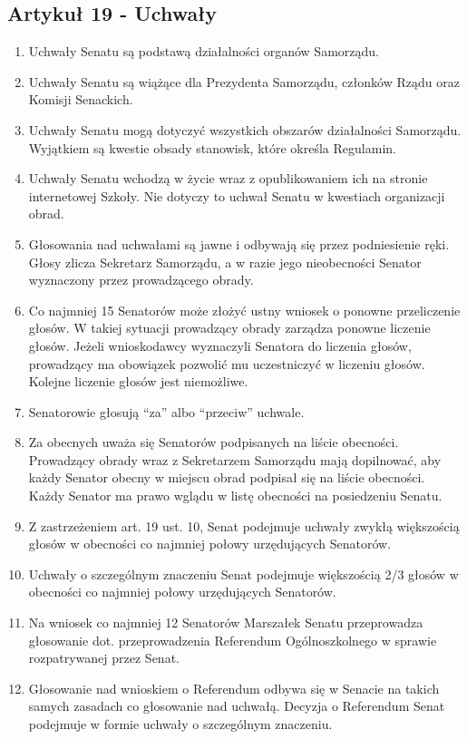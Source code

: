 \documentclass[14pt]{article}
\newenvironment{ustepy}{%
	\begin{enumerate}[leftmargin=1.5em, itemindent=1pt, labelwidth=1em, itemsep=5pt]
	}{%
	\end{enumerate}
}
\begin{document}
\subsection*{Artykuł 19 - Uchwały}
\begin{ustepy}
	\item Uchwały Senatu są podstawą działalności organów Samorządu.
	\item Uchwały Senatu są wiążące dla Prezydenta Samorządu, członków Rządu oraz Komisji Senackich.
	\item Uchwały Senatu mogą dotyczyć wszystkich obszarów działalności Samorządu. Wyjątkiem są kwestie obsady stanowisk, które określa Regulamin.
	\item Uchwały Senatu wchodzą w życie wraz z opublikowaniem ich na stronie internetowej Szkoły. Nie dotyczy to uchwał Senatu w kwestiach organizacji obrad.
	\item Głosowania nad uchwałami są jawne i odbywają się przez podniesienie ręki. Głosy zlicza Sekretarz Samorządu, a w razie jego nieobecności Senator wyznaczony przez prowadzącego obrady.
	\item Co najmniej 15 Senatorów może złożyć ustny wniosek o ponowne przeliczenie głosów. W takiej sytuacji prowadzący obrady zarządza ponowne liczenie głosów. Jeżeli wnioskodawcy wyznaczyli Senatora do liczenia głosów, prowadzący ma obowiązek pozwolić mu uczestniczyć w liczeniu głosów. Kolejne liczenie głosów jest niemożliwe. 
	\item Senatorowie głosują “za” albo “przeciw” uchwale. 
	\item Za obecnych uważa się Senatorów podpisanych na liście obecności. Prowadzący obrady wraz z Sekretarzem Samorządu mają dopilnować, aby każdy Senator obecny w miejscu obrad podpisał się na liście obecności. Każdy Senator ma prawo wglądu w listę obecności na posiedzeniu Senatu.
	\item Z zastrzeżeniem art. 19 ust. 10, Senat podejmuje uchwały zwykłą większością głosów w obecności co najmniej połowy urzędujących Senatorów.
	\item Uchwały o szczególnym znaczeniu Senat podejmuje większością 2/3 głosów w obecności co najmniej połowy urzędujących Senatorów. 
	\item Na wniosek co najmniej 12 Senatorów Marszałek Senatu przeprowadza głosowanie dot. przeprowadzenia Referendum Ogólnoszkolnego w sprawie rozpatrywanej przez Senat.
	\item Głosowanie nad wnioskiem o Referendum odbywa się w Senacie na takich samych zasadach co głosowanie nad uchwałą. Decyzja o Referendum Senat podejmuje w formie uchwały o szczególnym znaczeniu.

\end{ustepy}
\end{document}
